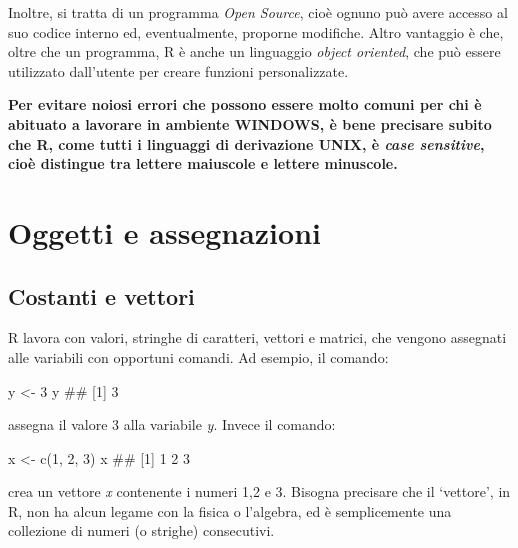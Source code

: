 \documentclass[a4paper,12pt,oneside]{book}
\newenvironment{Shaded}{\begin{snugshade}}{\end{snugshade}}
\newcommand{\DecValTok}[1]{#1}
\newcommand{\DocumentationTok}[1]{#1}
\newcommand{\OtherTok}[1]{#1}
\newcommand{\FunctionTok}[1]{#1}
\newcommand{\NormalTok}[1]{#1}
\begin{document}
Inoltre, si tratta di un programma \emph{Open Source}, cioè ognuno può avere accesso al suo codice interno ed, eventualmente, proporne modifiche. Altro vantaggio è che, oltre che un programma, R è anche un linguaggio \emph{object oriented}, che può essere utilizzato dall'utente per creare funzioni personalizzate.

\textbf{Per evitare noiosi errori che possono essere molto comuni per chi è abituato a lavorare in ambiente WINDOWS, è bene precisare subito che R, come tutti i linguaggi di derivazione UNIX, è \emph{case sensitive}, cioè distingue tra lettere maiuscole e lettere minuscole.}

\hypertarget{oggetti-e-assegnazioni}{%
\section*{Oggetti e assegnazioni}\label{oggetti-e-assegnazioni}}

\hypertarget{costanti-e-vettori}{%
\subsection*{Costanti e vettori}\label{costanti-e-vettori}}

R lavora con valori, stringhe di caratteri, vettori e matrici, che vengono assegnati alle variabili con opportuni comandi. Ad esempio, il comando:

\begin{Shaded}
\begin{Highlighting}[]
\NormalTok{y  }\OtherTok{\textless{}{-}}  \DecValTok{3}
\NormalTok{y}
\DocumentationTok{\#\# [1] 3}
\end{Highlighting}
\end{Shaded}

assegna il valore 3 alla variabile \emph{y}. Invece il comando:

\begin{Shaded}
\begin{Highlighting}[]
\NormalTok{x  }\OtherTok{\textless{}{-}}  \FunctionTok{c}\NormalTok{(}\DecValTok{1}\NormalTok{, }\DecValTok{2}\NormalTok{, }\DecValTok{3}\NormalTok{)}
\NormalTok{x}
\DocumentationTok{\#\# [1] 1 2 3}
\end{Highlighting}
\end{Shaded}

crea un vettore \emph{x} contenente i numeri 1,2 e 3. Bisogna precisare che il `vettore', in R, non ha alcun legame con la fisica o l'algebra, ed è semplicemente una collezione di numeri (o strighe) consecutivi.
\end{document}
